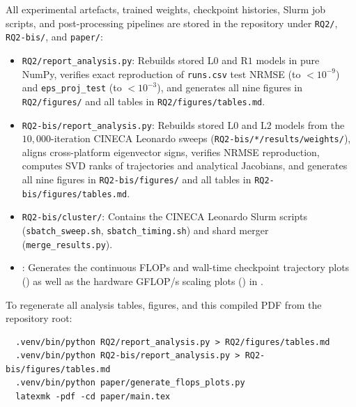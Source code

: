 All experimental artefacts, trained weights, checkpoint histories, Slurm job scripts, and post-processing pipelines are stored in the repository under \texttt{RQ2/}, \texttt{RQ2-bis/}, and \texttt{paper/}:
\begin{itemize}[leftmargin=2em]
  \item \texttt{RQ2/report\_analysis.py}: Rebuilds stored $\mathrm{L0}$ and $\mathrm{R1}$ models in pure NumPy, verifies exact reproduction of \texttt{runs.csv} test NRMSE (to $< 10^{-9}$) and \texttt{eps\_proj\_test} (to $< 10^{-3}$), and generates all nine figures in \texttt{RQ2/figures/} and all tables in \texttt{RQ2/figures/tables.md}.
  \item \texttt{RQ2-bis/report\_analysis.py}: Rebuilds stored $\mathrm{L0}$ and $\mathrm{L2}$ models from the $10{,}000$-iteration CINECA Leonardo sweeps (\texttt{RQ2-bis/*/results/weights/}), aligns cross-platform eigenvector signs, verifies NRMSE reproduction, computes SVD ranks of trajectories and analytical Jacobians, and generates all nine figures in \texttt{RQ2-bis/figures/} and all tables in \texttt{RQ2-bis/figures/tables.md}.
  \item \texttt{RQ2-bis/cluster/}: Contains the CINECA Leonardo Slurm scripts (\texttt{sbatch\_sweep.sh}, \texttt{sbatch\_timing.sh}) and shard merger (\texttt{merge\_results.py}).
  \item {}: Generates the continuous FLOPs and wall-time checkpoint trajectory plots () as well as the hardware GFLOP/s scaling plots () in .
\end{itemize}
To regenerate all analysis tables, figures, and this compiled PDF from the repository root:
\begin{verbatim}
  .venv/bin/python RQ2/report_analysis.py > RQ2/figures/tables.md
  .venv/bin/python RQ2-bis/report_analysis.py > RQ2-bis/figures/tables.md
  .venv/bin/python paper/generate_flops_plots.py
  latexmk -pdf -cd paper/main.tex
\end{verbatim}
